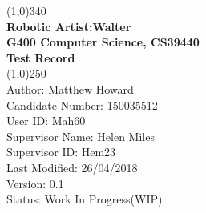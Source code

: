 \documentclass{article}
\begin{document}

    \begin{titlepage}

        \begin{center}

        \line(1,0){340}\\ 


        \large{\bfseries Robotic Artist:Walter} \\

        \large {\bfseries G400 Computer Science, CS39440 }\\
        
        \large {\bfseries Test Record}\\


         \line(1,0){250}\\

         \textsf {Author: Matthew Howard \\
          Candidate Number: 150035512\\
          User ID: Mah60 \\
          Supervisor Name: Helen Miles \\
          Supervisor ID: Hem23\\
          Last Modified: 26/04/2018 \\
          Version: 0.1\\
          Status: Work In Progress(WIP)} \\

        \end{center}        

    \end{titlepage}
  
    \clearpage

     \tableofcontents
     
     \clearpage
     
     
\end{document}
